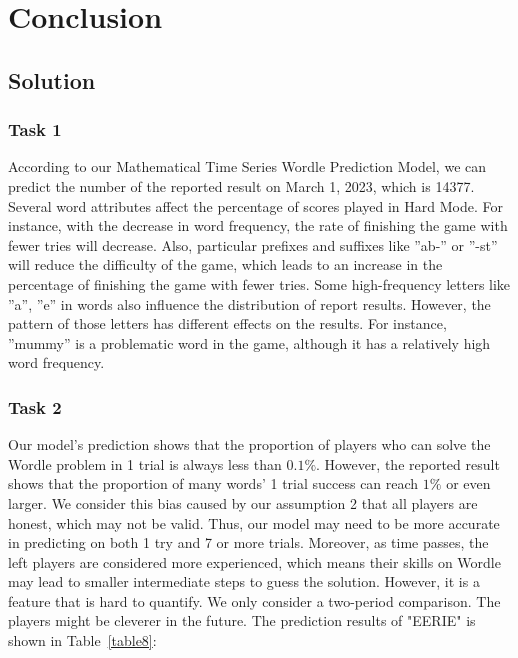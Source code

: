 \documentclass[12pt]{article}
\begin{document}
\clearpage

\section{Conclusion}

\subsection{Solution}

\subsubsection{Task 1}
According to our Mathematical Time Series Wordle Prediction Model, we can predict the number of the reported result on March 1, 2023, which is 14377. Several word attributes affect the percentage of scores played in Hard Mode. For instance, with the decrease in word frequency, the rate of finishing the game with fewer tries will decrease. Also, particular prefixes and suffixes like ”ab-” or ”-st” will reduce the difficulty of the game, which leads to an increase in the percentage of finishing the game with fewer tries. Some high-frequency letters like ”a”, ”e” in words also influence the distribution of report results. However, the pattern of those letters has different effects on the results. For instance, ”mummy” is a problematic word in the game, although it has a relatively high word frequency.

\subsubsection{Task 2}
Our model's prediction shows that the proportion of players who can solve the Wordle problem in 1 trial is always less than $0.1\%$. However, the reported result shows that the proportion of many words' 1 trial success can reach $1\%$ or even larger. We consider this bias caused by our assumption 2 that all players are honest, which may not be valid. Thus, our model may need to be more accurate in predicting on both 1 try and 7 or more trials. Moreover, as time passes, the left players are considered more experienced, which means their skills on Wordle may lead to smaller intermediate steps to guess the solution. However, it is a feature that is hard to quantify. We only consider a two-period comparison. The players might be cleverer in the future.
The prediction results of "EERIE" is shown in Table~\ref{table8}:
\end{document}
